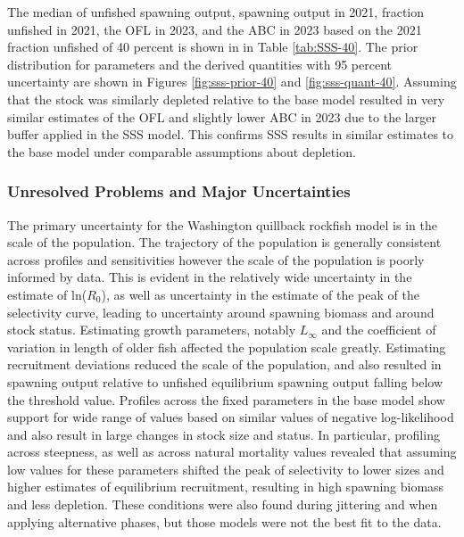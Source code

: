 \documentclass[11pt,
  english,
  a4paper,
]{article}
\begin{document}
\leavevmode\tagmcend\tagstructend\par


The median of unfished spawning output, spawning output in 2021, fraction unfished in 2021, the OFL in 2023, and the ABC in 2023 based on the 2021 fraction unfished of 40 percent is shown in in Table \ref{tab:SSS-40}. The prior distribution for parameters and the derived quantities with 95 percent uncertainty are shown in Figures \ref{fig:sss-prior-40} and \ref{fig:sss-quant-40}. Assuming that the stock was similarly depleted relative to the base model resulted in very similar estimates of the OFL and slightly lower ABC in 2023 due to the larger buffer applied in the SSS model. This confirms SSS results in similar estimates to the base model under comparable assumptions about depletion.

\leavevmode\tagmcend\tagstructend\par


\hypertarget{unresolved-problems-and-major-uncertainties}{%
\subsubsection{Unresolved Problems and Major Uncertainties}\label{unresolved-problems-and-major-uncertainties}}

\leavevmode\tagmcend\tagstructend


The primary uncertainty for the Washington quillback rockfish model is in the scale of the population. The trajectory of the population is generally consistent across profiles and sensitivities however the scale of the population is poorly informed by data. This is evident in the relatively wide uncertainty in the estimate of ln({\(R_0\)\leavevmode\tagmcend\tagstructend}), as well as uncertainty in the estimate of the peak of the selectivity curve, leading to uncertainty around spawning biomass and around stock status. Estimating growth parameters, notably {\(L_{\infty}\)\leavevmode\tagmcend\tagstructend} and the coefficient of variation in length of older fish affected the population scale greatly. Estimating recruitment deviations reduced the scale of the population, and also resulted in spawning output relative to unfished equilibrium spawning output falling below the threshold value. Profiles across the fixed parameters in the base model show support for wide range of values based on similar values of negative log-likelihood and also result in large changes in stock size and status. In particular, profiling across steepness, as well as across natural mortality values revealed that assuming low values for these parameters shifted the peak of selectivity to lower sizes and higher estimates of equilibrium recruitment, resulting in high spawning biomass and less depletion. These conditions were also found during jittering and when applying alternative phases, but those models were not the best fit to the data.
\end{document}
